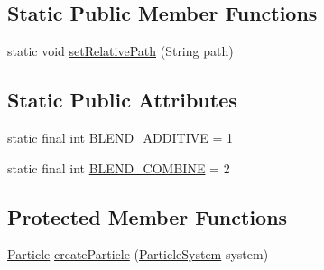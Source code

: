 \subsection*{Static Public Member Functions}
\begin{DoxyCompactItemize}
\item 
static void \mbox{\hyperlink{classorg_1_1newdawn_1_1slick_1_1particles_1_1_particle_system_ae11b05b6d526fb199647632d8aa93b74}{set\+Relative\+Path}} (String path)
\end{DoxyCompactItemize}
\subsection*{Static Public Attributes}
\begin{DoxyCompactItemize}
\item 
static final int \mbox{\hyperlink{classorg_1_1newdawn_1_1slick_1_1particles_1_1_particle_system_a45d2539c9c844aa1bb63c9d7b090d406}{B\+L\+E\+N\+D\+\_\+\+A\+D\+D\+I\+T\+I\+VE}} = 1
\item 
static final int \mbox{\hyperlink{classorg_1_1newdawn_1_1slick_1_1particles_1_1_particle_system_a6e5a43dd58a794750f52fa0df8282e75}{B\+L\+E\+N\+D\+\_\+\+C\+O\+M\+B\+I\+NE}} = 2
\end{DoxyCompactItemize}
\subsection*{Protected Member Functions}
\begin{DoxyCompactItemize}
\item 
\mbox{\hyperlink{classorg_1_1newdawn_1_1slick_1_1particles_1_1_particle}{Particle}} \mbox{\hyperlink{classorg_1_1newdawn_1_1slick_1_1particles_1_1_particle_system_ac03492cca10c01f7df6968e4293f65b7}{create\+Particle}} (\mbox{\hyperlink{classorg_1_1newdawn_1_1slick_1_1particles_1_1_particle_system}{Particle\+System}} system)
\end{DoxyCompactItemize}
